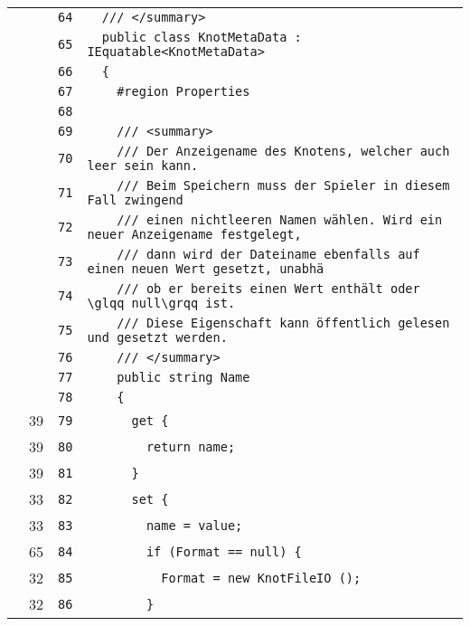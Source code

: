 \documentclass[a4paper,10pt]{article}
\begin{document}
\begin{longtable}[l]{lrrl}
\cellcolor{gray} &  & \verb~64~ & \verb~  /// </summary>~\\
\cellcolor{gray} &  & \verb~65~ & \verb~  public class KnotMetaData : IEquatable<KnotMetaData>~\\
\cellcolor{gray} &  & \verb~66~ & \verb~  {~\\
\cellcolor{gray} &  & \verb~67~ & \verb~    #region Properties~\\
\cellcolor{gray} &  & \verb~68~ & \verb~~\\
\cellcolor{gray} &  & \verb~69~ & \verb~    /// <summary>~\\
\cellcolor{gray} &  & \verb~70~ & \verb~    /// Der Anzeigename des Knotens, welcher auch leer sein kann.~\\
\cellcolor{gray} &  & \verb~71~ & \verb~    /// Beim Speichern muss der Spieler in diesem Fall zwingend~\\
\cellcolor{gray} &  & \verb~72~ & \verb~    /// einen nichtleeren Namen wählen. Wird ein neuer Anzeigename festgelegt,~\\
\cellcolor{gray} &  & \verb~73~ & \verb~    /// dann wird der Dateiname ebenfalls auf einen neuen Wert gesetzt, unabhä~\\
\cellcolor{gray} &  & \verb~74~ & \verb~    /// ob er bereits einen Wert enthält oder \glqq null\grqq ist.~\\
\cellcolor{gray} &  & \verb~75~ & \verb~    /// Diese Eigenschaft kann öffentlich gelesen und gesetzt werden.~\\
\cellcolor{gray} &  & \verb~76~ & \verb~    /// </summary>~\\
\cellcolor{gray} &  & \verb~77~ & \verb~    public string Name~\\
\cellcolor{gray} &  & \verb~78~ & \verb~    {~\\
\cellcolor{green} & 39 & \verb~79~ & \verb~      get {~\\
\cellcolor{green} & 39 & \verb~80~ & \verb~        return name;~\\
\cellcolor{green} & 39 & \verb~81~ & \verb~      }~\\
\cellcolor{green} & 33 & \verb~82~ & \verb~      set {~\\
\cellcolor{green} & 33 & \verb~83~ & \verb~        name = value;~\\
\cellcolor{green} & 65 & \verb~84~ & \verb~        if (Format == null) {~\\
\cellcolor{green} & 32 & \verb~85~ & \verb~          Format = new KnotFileIO ();~\\
\cellcolor{green} & 32 & \verb~86~ & \verb~        }~\\

\end{longtable}
\end{document}
